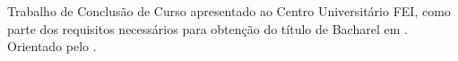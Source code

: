 \documentclass{fei}
\author{
\alunoUm\\
\alunoDois\\
\alunoTres\\
\alunoQuatro\\
\alunoCinco
}
\title{\titulo}
\begin{document}
\maketitle
\begin{folhaderosto}
    Trabalho de Conclusão de Curso apresentado ao Centro Universitário FEI, como parte dos requisitos necessários para obtenção do título de Bacharel em \alunoCurso. Orientado pelo \orientador.
\end{folhaderosto}

\tableofcontents

{

    
    
    
    
    
    
} 
{
    
    \fichacatalografica
    \folhadeaprovacao
    
    
    
    \listoffigures
    \listoftables
    \listofalgorithms
    \glsaddall
    \printglossaries

    
    
    
    
    
    
    
    
    
}

\printbibliography

\end{document}

